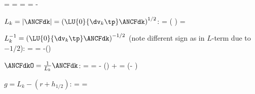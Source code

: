   \be
    \diffANCFt{\ANCFdkt} = 
    = 
  \ee
  \be
    \diffmIt{\ANCFdkt} = 
    = -
  \ee
  \item $L_k = |\ANCFdk| = \left(\LU{0}{\dv_k\tp} \ANCFdk \right) ^{1/2}$:
  \be
    \diffANCFmI{ |\ANCFdk| } = \left( \diffANCFdk \right) =
    \ANCFdkOtp \diffANCFdk 
  \ee
  \item $L_k^{-1} = \left(\LU{0}{\dv_k\tp} \ANCFdk \right) ^{-1/2}$ (note different sign as in $L$-term due to $-1/2$):
  \be
     =  = 
    -\left(\ANCFdkOtp \diffANCFdk \right)
  \ee
  \item $\ANCFdkO = \frac{1}{L_k} \ANCFdk$: 
  \be
    \diffANCFmI{ \ANCFdkO } =  = 
    - \ANCFdk \otimes \left(\ANCFdkOtp \diffANCFdk \right) 
    +  \diffANCFdk =  \left(\Im - \ANCFdkO \otimes \ANCFdkO \right) \diffANCFdk
    \ee
  \item $g= L_k - (r + h_{1/2})$:
  \be
     =  =
    \ANCFdkOtp \diffANCFdk 
  \ee
